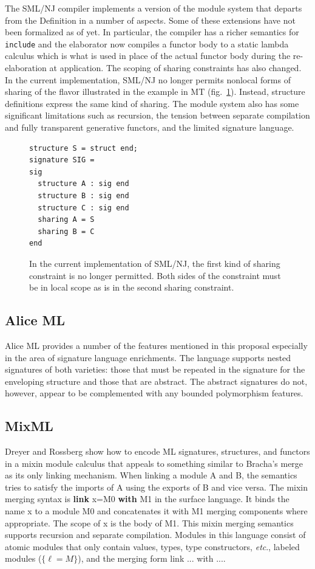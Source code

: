 \documentclass[12pt]{article}
\begin{document}
The SML/NJ compiler implements a version of the module system that departs from the Definition in a number of aspects. Some of these extensions have not been formalized as of yet. In particular, the compiler has a richer semantics for \lstinline{include} and the elaborator now compiles a functor body to a static lambda calculus which is what is used in place of the actual functor body during the re-elaboration at application. The scoping of sharing constraints has also changed. In the current implementation, SML/NJ no longer permits nonlocal forms of sharing of the flavor illustrated in the example in MT (fig.~\ref{fig:nonlocalsharing}). Instead, structure definitions express the same kind of sharing. The module system also has some significant limitations such as recursion, the tension between separate compilation and fully transparent generative functors, and the limited signature language.

\begin{figure}
\begin{lstlisting}
structure S = struct end;
signature SIG = 
sig
  structure A : sig end
  structure B : sig end
  structure C : sig end
  sharing A = S
  sharing B = C
end	
\end{lstlisting}	
\caption{In the current implementation of SML/NJ, the first kind of sharing constraint is no longer permitted. Both sides of the constraint must be in local scope as is in the second sharing constraint.}
\label{fig:nonlocalsharing}
\end{figure}

\subsection{Alice ML}
Alice ML provides a number of the features mentioned in this proposal especially in the 
area of signature language enrichments. The language supports nested signatures of both varieties: those that must be repeated in the signature for the enveloping structure and those that are abstract. The abstract signatures do not, however, appear to be complemented with any bounded polymorphism features. 

\subsection{MixML}
		Dreyer and Rossberg \cite{mixml} show how to encode ML signatures, structures, and functors in a mixin module calculus that appeals to something similar to Bracha's merge\cite{bracha:thesis} as its only linking mechanism. When linking a module A and B, the semantics tries to satisfy the imports of A using the exports of B and vice versa. The mixin merging syntax is {\bf link} x=M0 {\bf with} M1 in the surface language. It binds the name x to a module M0 and concatenates it with M1 merging components where appropriate. The scope of x is the body of M1. This mixin merging semantics supports recursion and separate compilation. Modules in this language consist of atomic modules that only contain values, types, type constructors, {\it etc}., labeled modules ($\{\ell = M\}$), and the merging form link ... with ....  
\end{document}
